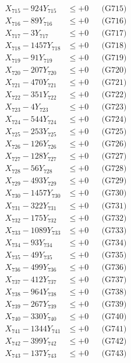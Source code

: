 \documentclass[a4paper,10pt]{article}
\begin{document}
{\begin{align}
X_{715} - 924Y_{715} &\leq +0 && \text{(G715)} \\
X_{716} - 89Y_{716} &\leq +0 && \text{(G716)} \\
X_{717} - 3Y_{717} &\leq +0 && \text{(G717)} \\
X_{718} - 1457Y_{718} &\leq +0 && \text{(G718)} \\
X_{719} - 91Y_{719} &\leq +0 && \text{(G719)} \\
X_{720} - 207Y_{720} &\leq +0 && \text{(G720)} \\
\allowbreak
X_{721} - 470Y_{721} &\leq +0 && \text{(G721)} \\
X_{722} - 351Y_{722} &\leq +0 && \text{(G722)} \\
X_{723} - 4Y_{723} &\leq +0 && \text{(G723)} \\
X_{724} - 544Y_{724} &\leq +0 && \text{(G724)} \\
X_{725} - 253Y_{725} &\leq +0 && \text{(G725)} \\
X_{726} - 126Y_{726} &\leq +0 && \text{(G726)} \\
X_{727} - 128Y_{727} &\leq +0 && \text{(G727)} \\
X_{728} - 56Y_{728} &\leq +0 && \text{(G728)} \\
X_{729} - 493Y_{729} &\leq +0 && \text{(G729)} \\
X_{730} - 1457Y_{730} &\leq +0 && \text{(G730)} \\
\allowbreak
X_{731} - 322Y_{731} &\leq +0 && \text{(G731)} \\
X_{732} - 175Y_{732} &\leq +0 && \text{(G732)} \\
X_{733} - 1089Y_{733} &\leq +0 && \text{(G733)} \\
X_{734} - 93Y_{734} &\leq +0 && \text{(G734)} \\
X_{735} - 49Y_{735} &\leq +0 && \text{(G735)} \\
X_{736} - 499Y_{736} &\leq +0 && \text{(G736)} \\
X_{737} - 412Y_{737} &\leq +0 && \text{(G737)} \\
X_{738} - 964Y_{738} &\leq +0 && \text{(G738)} \\
X_{739} - 267Y_{739} &\leq +0 && \text{(G739)} \\
X_{740} - 330Y_{740} &\leq +0 && \text{(G740)} \\
\allowbreak
X_{741} - 1344Y_{741} &\leq +0 && \text{(G741)} \\
X_{742} - 399Y_{742} &\leq +0 && \text{(G742)} \\
X_{743} - 137Y_{743} &\leq +0 && \text{(G743)} \\

\end{align}}
\end{document}
